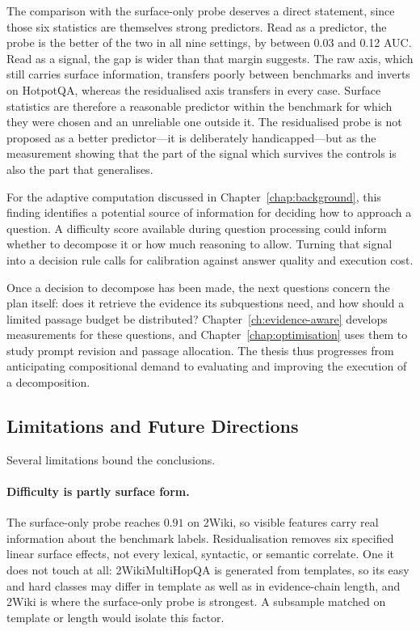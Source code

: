 The comparison with the surface-only probe deserves a direct statement, since
those six statistics are themselves strong predictors. Read as a predictor, the
probe is the better of the two in all nine settings, by between 0.03 and 0.12
AUC. Read as a signal, the gap is wider than that margin suggests. The raw
axis, which still carries surface information, transfers poorly between
benchmarks and inverts on HotpotQA, whereas the residualised axis transfers in
every case. Surface statistics are therefore a reasonable predictor within the
benchmark for which they were chosen and an unreliable one outside it. The
residualised probe is not proposed as a better predictor---it is deliberately
handicapped---but as the measurement showing that the part of the signal which
survives the controls is also the part that generalises.

For the adaptive computation discussed in Chapter~\ref{chap:background},
this finding identifies a potential source of information for deciding how
to approach a question. A difficulty score available during question
processing could inform whether to decompose it or how much reasoning to
allow. Turning that signal into a decision rule calls for calibration against
answer quality and execution cost.

Once a decision to decompose has been made, the next questions concern the
plan itself: does it retrieve the evidence its subquestions need, and how
should a limited passage budget be distributed? Chapter~\ref{ch:evidence-aware}
develops measurements for these questions, and Chapter~\ref{chap:optimisation}
uses them to study prompt revision and passage allocation. The thesis thus
progresses from anticipating compositional demand to evaluating and improving
the execution of a decomposition.

\subsection{Limitations and Future Directions}
\label{subsec:probing-limitations}

Several limitations bound the conclusions.

\paragraph{Difficulty is partly surface form.}
The surface-only probe reaches \(0.91\) on 2Wiki, so visible features carry
real information about the benchmark labels. Residualisation removes six
specified linear surface effects, not every lexical, syntactic, or semantic
correlate. One it does not touch at all: 2WikiMultiHopQA is generated from
templates, so its easy and hard classes may differ in template as well as in
evidence-chain length, and 2Wiki is where the surface-only probe is strongest.
A subsample matched on template or length would isolate this factor.

